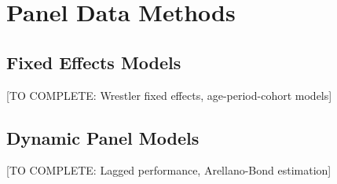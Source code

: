 \section{Panel Data Methods}

\subsection{Fixed Effects Models}

[TO COMPLETE: Wrestler fixed effects, age-period-cohort models]

\subsection{Dynamic Panel Models}

[TO COMPLETE: Lagged performance, Arellano-Bond estimation]